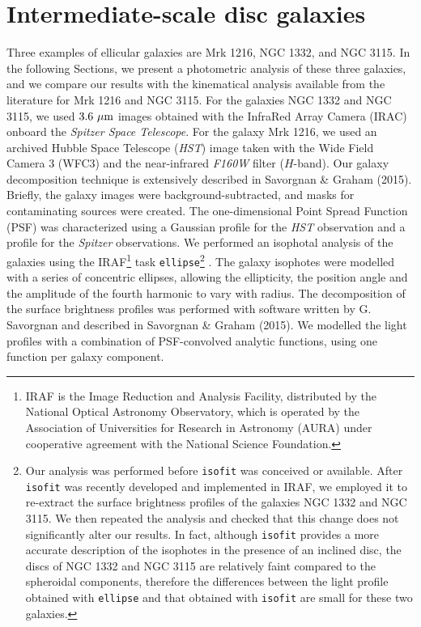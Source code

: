 \documentclass[useAMS,usenatbib,article]{mn2e}
\begin{document}
\section{Intermediate-scale disc galaxies}
\label{sec:gal}
Three examples of ellicular galaxies are Mrk 1216, NGC 1332, and NGC 3115. 
In the following Sections, we present a photometric analysis of these three galaxies, 
and we compare our results with the kinematical analysis available from the literature for Mrk 1216 and NGC 3115. 
For the galaxies NGC 1332 and NGC 3115, we used $3.6~\rm \mu m$ images obtained with the InfraRed Array Camera (IRAC) 
onboard the \emph{Spitzer Space Telescope}. 
For the galaxy Mrk 1216, we used an archived Hubble Space Telescope (\emph{HST}) image  
taken with the Wide Field Camera 3 (WFC3) and the near-infrared \emph{F160W} filter ($H$-band). 
Our galaxy decomposition technique is extensively described in Savorgnan \& Graham (2015).
Briefly, the galaxy images were background-subtracted, and masks for contaminating sources were created. 
The one-dimensional Point Spread Function (PSF) was characterized using a Gaussian profile for the \emph{HST} observation 
and a \cite{moffat1969} profile for the \emph{Spitzer} observations.
We performed an isophotal analysis of the galaxies using the IRAF\footnote{IRAF 
is the Image Reduction and Analysis Facility, distributed by the National Optical Astronomy Observatory, 
which is operated by the Association of Universities for Research in Astronomy (AURA) 
under cooperative agreement with the National Science Foundation.} task {\tt ellipse}\footnote{Our analysis 
was performed before {\tt isofit} \citep{ciambur2015} was conceived or available. 
After {\tt isofit} was recently developed and implemented in IRAF, 
we employed it to re-extract the surface brightness profiles of the galaxies NGC 1332 and NGC 3115. 
We then repeated the analysis and checked that this change does not significantly alter our results. 
In fact, although {\tt isofit} provides a more accurate description of the isophotes in the presence of an inclined disc, 
the discs of NGC 1332 and NGC 3115 are relatively faint compared to the spheroidal components, 
therefore the differences between the light profile obtained with {\tt ellipse} and that obtained with {\tt isofit} 
are small for these two galaxies. } 
\citep{taskellipse}. 
The galaxy isophotes were modelled with a series of concentric ellipses, 
allowing the ellipticity, the position angle and the amplitude of the fourth harmonic to vary with radius.  
The decomposition of the surface brightness profiles was performed with software written by G. Savorgnan 
and described in Savorgnan \& Graham (2015).
We modelled the light profiles with a combination of PSF-convolved analytic functions, 
using one function per galaxy component. 
\end{document}
